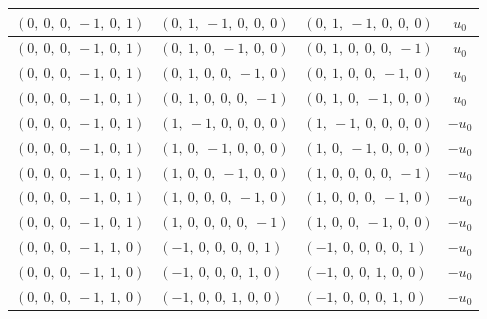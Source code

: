 \documentclass[11pt]{article}
\theoremstyle{definition}
\begin{document}
\begin{longtable}{|l|l|l|c|}
    \hline
    $\left( 0, \  0, \  0, \  -1, \  0, \  1\right)$ & $\left( 0, \  1, \  -1, \  0, \  0, \  0\right)$ & $\left( 0, \  1, \  -1, \  0, \  0, \  0\right)$ & $u_{0}$ \\
    \hline
    $\left( 0, \  0, \  0, \  -1, \  0, \  1\right)$ & $\left( 0, \  1, \  0, \  -1, \  0, \  0\right)$ & $\left( 0, \  1, \  0, \  0, \  0, \  -1\right)$ & $u_{0}$ \\
    \hline
    $\left( 0, \  0, \  0, \  -1, \  0, \  1\right)$ & $\left( 0, \  1, \  0, \  0, \  -1, \  0\right)$ & $\left( 0, \  1, \  0, \  0, \  -1, \  0\right)$ & $u_{0}$ \\
    \hline
    $\left( 0, \  0, \  0, \  -1, \  0, \  1\right)$ & $\left( 0, \  1, \  0, \  0, \  0, \  -1\right)$ & $\left( 0, \  1, \  0, \  -1, \  0, \  0\right)$ & $u_{0}$ \\
    \hline
    $\left( 0, \  0, \  0, \  -1, \  0, \  1\right)$ & $\left( 1, \  -1, \  0, \  0, \  0, \  0\right)$ & $\left( 1, \  -1, \  0, \  0, \  0, \  0\right)$ & $- u_{0}$ \\
    \hline
    $\left( 0, \  0, \  0, \  -1, \  0, \  1\right)$ & $\left( 1, \  0, \  -1, \  0, \  0, \  0\right)$ & $\left( 1, \  0, \  -1, \  0, \  0, \  0\right)$ & $- u_{0}$ \\
    \hline
    $\left( 0, \  0, \  0, \  -1, \  0, \  1\right)$ & $\left( 1, \  0, \  0, \  -1, \  0, \  0\right)$ & $\left( 1, \  0, \  0, \  0, \  0, \  -1\right)$ & $- u_{0}$ \\
    \hline
    $\left( 0, \  0, \  0, \  -1, \  0, \  1\right)$ & $\left( 1, \  0, \  0, \  0, \  -1, \  0\right)$ & $\left( 1, \  0, \  0, \  0, \  -1, \  0\right)$ & $- u_{0}$ \\
    \hline
    $\left( 0, \  0, \  0, \  -1, \  0, \  1\right)$ & $\left( 1, \  0, \  0, \  0, \  0, \  -1\right)$ & $\left( 1, \  0, \  0, \  -1, \  0, \  0\right)$ & $- u_{0}$ \\
    \hline
    $\left( 0, \  0, \  0, \  -1, \  1, \  0\right)$ & $\left( -1, \  0, \  0, \  0, \  0, \  1\right)$ & $\left( -1, \  0, \  0, \  0, \  0, \  1\right)$ & $- u_{0}$ \\
    \hline
    $\left( 0, \  0, \  0, \  -1, \  1, \  0\right)$ & $\left( -1, \  0, \  0, \  0, \  1, \  0\right)$ & $\left( -1, \  0, \  0, \  1, \  0, \  0\right)$ & $- u_{0}$ \\
    \hline
    $\left( 0, \  0, \  0, \  -1, \  1, \  0\right)$ & $\left( -1, \  0, \  0, \  1, \  0, \  0\right)$ & $\left( -1, \  0, \  0, \  0, \  1, \  0\right)$ & $- u_{0}$ \\

\end{longtable}
\end{document}
